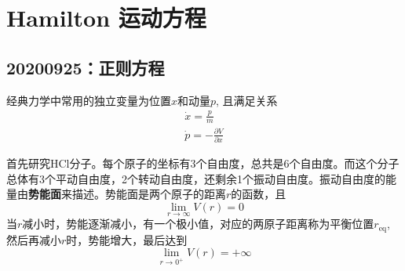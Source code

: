 \chapter{Hamilton 运动方程}
    \section{20200925：正则方程}
    经典力学中常用的独立变量为位置$x$和动量$p$, 且满足关系
    \begin{align*}
        \dot{x} = \frac pm\\
        \dot{p} = -\frac {\partial V}{\partial x}
    \end{align*}

    首先研究HCl分子。每个原子的坐标有3个自由度，总共是6个自由度。而这个分子总体有3个平动自由度，2个转动自由度，还剩余1个振动自由度。振动自由度的能量由\textbf{势能面}来描述。势能面是两个原子的距离$r$的函数，且
    \begin{equation*}
        \lim_{r \to \infty} V(r) = 0
    \end{equation*}
    当$r$减小时，势能逐渐减小，有一个极小值，对应的两原子距离称为平衡位置$r_\mathrm{eq}$, 然后再减小$r$时，势能增大，最后达到
    \begin{equation*}
        \lim_{r \to 0^+} V(r) = +\infty
    \end{equation*}

